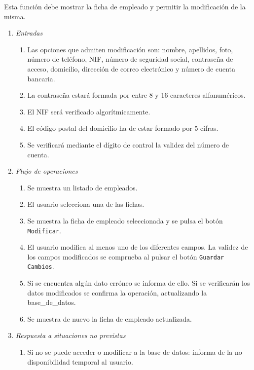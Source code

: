 	Esta función debe mostrar la ficha de empleado y permitir la modificación de la misma.

\begin{enumerate}
	\item \textit{Entradas}
	\begin{enumerate}
		\item Las opciones que admiten modificación son: nombre, apellidos, foto, número de teléfono, NIF, número de seguridad social, contraseña de acceso, domicilio, dirección de correo electrónico y número de cuenta bancaria.
		\item La contraseña estará formada por entre 8 y 16 caracteres alfanuméricos.
		\item El \gls{NIF} será verificado algorítmicamente.
		\item El código postal del domicilio ha de estar formado por 5 cifras.
		\item Se verificará mediante el dígito de control la validez del número de cuenta.
	\end{enumerate}
	\item \textit{Flujo de operaciones}
	\begin{enumerate}
		\item Se muestra un listado de empleados.
		\item El usuario selecciona una de las fichas.
		\item Se muestra la ficha de empleado seleccionada y se pulsa el botón \verb|Modificar|.
		\item El usuario modifica al menos uno de los diferentes campos. La validez de los campos modificados se comprueba al pulsar el botón \verb|Guardar Cambios|.
		\item Si se encuentra algún dato erróneo se informa de ello. Si se verificarán los datos modificados se confirma la operación, actualizando la \gls{base_de_datos}.
		\item Se muestra de nuevo la ficha de empleado actualizada.
	\end{enumerate}
	\item \textit{Respuesta a situaciones no previstas}
	\begin{enumerate}
		\item Si no se puede acceder o modificar a la base de datos: informa de la no disponibilidad temporal al usuario.
	\end{enumerate}
\end{enumerate}
